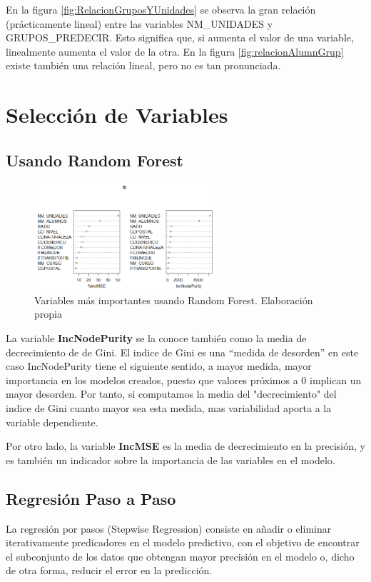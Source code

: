 \begin{subappendices}
\begin{figure}[htb]
\end{figure}
\FloatBarrier

En la figura \ref{fig:RelacionGruposYUnidades} se observa la gran relación (prácticamente lineal) entre las variables NM\_UNIDADES y GRUPOS\_PREDECIR. Esto significa que, si aumenta el valor de una variable, linealmente aumenta el valor de la otra. En la figura \ref{fig:relacionAlumnGrup} existe también una relación lineal, pero no es tan pronunciada.

\section{Selección de Variables}
\subsection{Usando Random Forest}
\label{appendix:AC1}
\begin{figure}[htb]
	\centering
	\caption{Variables más importantes usando Random Forest. Elaboración propia}
	\label{fig:VarImpRF}
	\includegraphics[width=0.6\textwidth]{recursos/ImagenesR/VarImpRF}
	
\end{figure}
\FloatBarrier
La variable \textbf{IncNodePurity} se la conoce también como la media de decrecimiento de de Gini. El indice de Gini es una ``medida de desorden'' en este caso IncNodePurity tiene el siguiente sentido, a mayor medida, mayor importancia en los modelos creados, puesto que valores próximos a 0 implican un mayor desorden. Por tanto, si computamos la media del "decrecimiento" del indice de Gini cuanto mayor sea esta medida, mas variabilidad aporta a la variable dependiente.

Por otro lado, la variable \textbf{IncMSE} es la media de decrecimiento en la precisión, y es también un indicador sobre la importancia de las variables en el modelo.
\subsection{Regresión Paso a Paso}
\label{appendix:A.C.2}
La regresión por pasos (Stepwise Regression) consiste en añadir o eliminar iterativamente predicadores en el modelo predictivo, con el objetivo de encontrar el subconjunto de los datos que obtengan mayor precisión en el modelo o, dicho de otra forma, reducir el error en la predicción. \cite{kassambara2018}


\end{subappendices}
